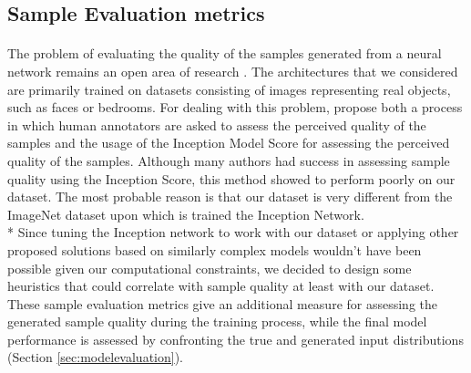 \subsection{Sample Evaluation metrics}
\label{sec:evaluation}
\paragraph{} The problem of evaluating the quality of the samples generated from a neural network remains an open area of research \cite{improved_gan}. The architectures that we considered are primarily trained on datasets consisting of images representing real objects, such as faces or bedrooms. For dealing with this problem, \citeauthor{improved_gan} propose both a process in which human annotators are asked to assess the perceived quality of the samples \cite[p.~4]{improved_gan} and the usage of the Inception Model \cite{inception} Score for assessing the perceived quality of the samples. Although many authors had success in assessing sample quality using the Inception Score, this method showed to perform poorly on our dataset. The most probable reason is that our dataset is very different from the ImageNet dataset upon which is trained the Inception Network. \\* Since tuning the Inception network to work with our dataset or applying other proposed solutions based on similarly complex models wouldn't have been possible given our computational constraints, we decided to design some heuristics that could correlate with sample quality at least with our dataset. These sample evaluation metrics give an additional measure for assessing the generated sample quality during the training process, while the final model performance is assessed by confronting the true and generated input distributions (Section \ref{sec:modelevaluation}).

